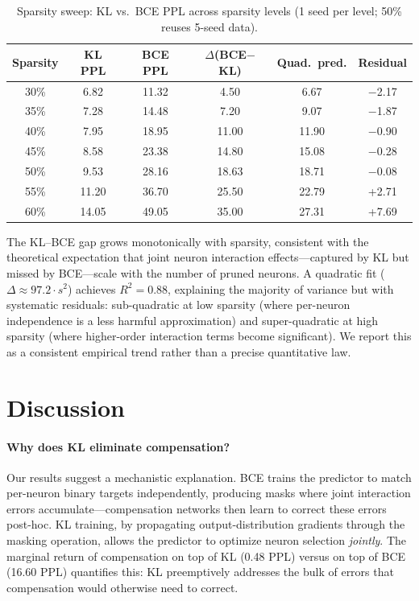 \documentclass[11pt]{article}
\begin{document}
\begin{table}[t]
\centering
\caption{Sparsity sweep: KL vs.\ BCE PPL across sparsity levels (1 seed per level; 50\% reuses 5-seed data).}
\label{tab:scaling}
\small
\begin{tabular}{cccccc}
\toprule
Sparsity & KL PPL & BCE PPL & $\Delta$(BCE$-$KL) & Quad.\ pred. & Residual \\
\midrule
30\% & 6.82 & 11.32 & 4.50 & 6.67 & $-$2.17 \\
35\% & 7.28 & 14.48 & 7.20 & 9.07 & $-$1.87 \\
40\% & 7.95 & 18.95 & 11.00 & 11.90 & $-$0.90 \\
45\% & 8.58 & 23.38 & 14.80 & 15.08 & $-$0.28 \\
50\% & 9.53 & 28.16 & 18.63 & 18.71 & $-$0.08 \\
55\% & 11.20 & 36.70 & 25.50 & 22.79 & +2.71 \\
60\% & 14.05 & 49.05 & 35.00 & 27.31 & +7.69 \\
\bottomrule
\end{tabular}
\end{table}

The KL--BCE gap grows monotonically with sparsity, consistent with the theoretical expectation that joint neuron interaction effects---captured by KL but missed by BCE---scale with the number of pruned neurons. A quadratic fit ($\Delta \approx 97.2 \cdot s^2$) achieves $R^2 = 0.88$, explaining the majority of variance but with systematic residuals: sub-quadratic at low sparsity (where per-neuron independence is a less harmful approximation) and super-quadratic at high sparsity (where higher-order interaction terms become significant). We report this as a consistent empirical trend rather than a precise quantitative law.


\section{Discussion}

\paragraph{Why does KL eliminate compensation?}
Our results suggest a mechanistic explanation. BCE trains the predictor to match per-neuron binary targets independently, producing masks where joint interaction errors accumulate---compensation networks then learn to correct these errors post-hoc. KL training, by propagating output-distribution gradients through the masking operation, allows the predictor to optimize neuron selection \emph{jointly}. The marginal return of compensation on top of KL (0.48 PPL) versus on top of BCE (16.60 PPL) quantifies this: KL preemptively addresses the bulk of errors that compensation would otherwise need to correct.
\end{document}
